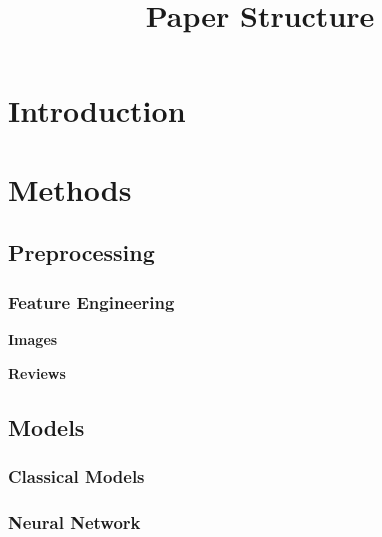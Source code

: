 \documentclass[12pt, letterpaper]{article}
\title{Paper Structure}
\author{}
\date{}
\begin{document}
\maketitle
\tableofcontents
\setcounter{tocdepth}{3}

\section{Introduction} %


\section{Methods} %


\subsection{Preprocessing} %

\subsubsection{Feature Engineering} %

\textbf{Images} %

\textbf{Reviews} %


\subsection{Models} %

\subsubsection{Classical Models} %

\subsubsection{Neural Network} %

\end{document}
